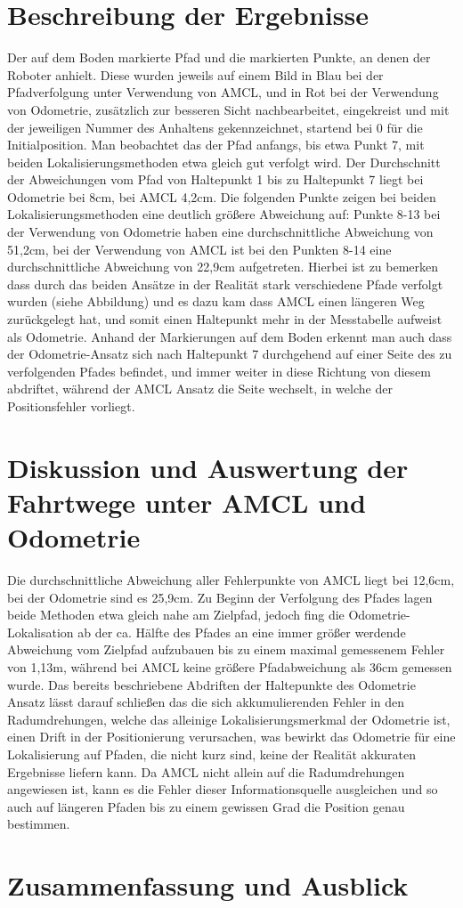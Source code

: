 \documentclass[11pt,a4paper]{article}
\begin{document}
\section{Beschreibung der Ergebnisse}
Der auf dem Boden markierte Pfad und die markierten Punkte, an denen der Roboter anhielt. Diese wurden jeweils auf einem Bild in Blau bei der Pfadverfolgung 
unter Verwendung von AMCL, und in Rot bei der Verwendung von Odometrie, zusätzlich zur besseren Sicht nachbearbeitet, eingekreist und mit der jeweiligen Nummer 
des Anhaltens gekennzeichnet, startend bei 0 für die Initialposition.
Man beobachtet das der Pfad anfangs, bis etwa Punkt 7, mit beiden Lokalisierungsmethoden etwa gleich gut verfolgt wird. Der Durchschnitt der Abweichungen vom Pfad 
von Haltepunkt 1 bis zu Haltepunkt 7 liegt bei Odometrie bei 8cm, bei AMCL 4,2cm. Die folgenden Punkte zeigen bei beiden Lokalisierungsmethoden eine deutlich 
größere Abweichung auf: Punkte 8-13 bei der Verwendung von Odometrie haben eine durchschnittliche Abweichung von 51,2cm, bei der Verwendung von AMCL ist bei den 
Punkten 8-14 eine durchschnittliche Abweichung von 22,9cm aufgetreten. Hierbei ist zu bemerken dass durch das beiden Ansätze in der Realität stark 
verschiedene Pfade verfolgt wurden (siehe Abbildung) und es dazu kam dass AMCL einen längeren Weg zurückgelegt hat, und somit einen Haltepunkt mehr in der Messtabelle 
aufweist als Odometrie.  Anhand der Markierungen auf dem Boden erkennt man auch dass der Odometrie-Ansatz sich nach Haltepunkt 7 durchgehend auf einer Seite des 
zu verfolgenden Pfades befindet, und immer weiter in diese Richtung von diesem abdriftet, während der AMCL Ansatz die Seite wechselt, in welche der Positionsfehler vorliegt.

\section{Diskussion und Auswertung der Fahrtwege unter AMCL und Odometrie}
Die durchschnittliche Abweichung aller Fehlerpunkte von AMCL liegt bei 12,6cm, bei der Odometrie sind es 25,9cm. Zu Beginn der Verfolgung des Pfades lagen beide Methoden 
etwa gleich nahe am Zielpfad, jedoch fing die Odometrie-Lokalisation  ab der ca. Hälfte des Pfades an eine immer größer werdende Abweichung vom Zielpfad aufzubauen bis 
zu einem maximal gemessenem Fehler von 1,13m, während bei AMCL keine größere Pfadabweichung als 36cm gemessen wurde. Das bereits beschriebene Abdriften der 
Haltepunkte des Odometrie Ansatz lässt darauf schließen das die sich akkumulierenden Fehler in den Radumdrehungen, welche das alleinige Lokalisierungsmerkmal 
der Odometrie ist, einen Drift in der Positionierung verursachen, was bewirkt das Odometrie für eine Lokalisierung auf Pfaden, die nicht kurz sind, keine der Realität 
akkuraten Ergebnisse liefern kann. Da AMCL nicht allein auf die Radumdrehungen angewiesen ist, kann es die Fehler dieser Informationsquelle ausgleichen und so auch auf 
längeren Pfaden bis zu einem gewissen Grad die Position genau bestimmen.

\section{Zusammenfassung und Ausblick}

{%

}
\end{document}
